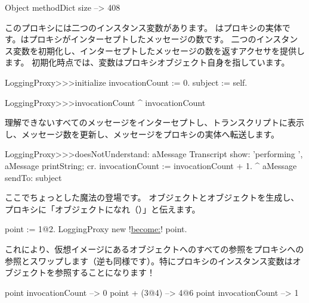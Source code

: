\documentclass[a4paper,10pt,twoside]{book}
\begin{document}
\begin{code}{}
Object methodDict size --> 408
\end{code}

このプロキシには二つのインスタンス変数があります。  はプロキシの実体です。はプロキシがインターセプトしたメッセージの数です。
二つのインスタンス変数を初期化し、インターセプトしたメッセージの数を返すアクセサを提供します。
初期化時点では、変数はプロキシオブジェクト自身を指しています。
\begin{code}{}
LoggingProxy>>>initialize
	invocationCount := 0.
	subject := self.
\end{code}

\begin{code}{}
LoggingProxy>>>invocationCount
	^ invocationCount
\end{code}

理解できないすべてのメッセージをインターセプトし、トランスクリプトに表示し、メッセージ数を更新し、メッセージをプロキシの実体へ転送します。

\begin{code}{}
LoggingProxy>>>doesNotUnderstand: aMessage 
	Transcript show: 'performing ', aMessage printString; cr.
	invocationCount := invocationCount + 1.
	^ aMessage sendTo: subject
\end{code}

ここでちょっとした魔法の登場です。
オブジェクトとオブジェクトを生成し、プロキシに「オブジェクトになれ（）」と伝えます。
\begin{code}{}
point := 1@2.
LoggingProxy new !\underline{become:}! point.
\end{code}

これにより、仮想イメージにあるオブジェクトへのすべての参照をプロキシへの参照とスワップします（逆も同様です）。特にプロキシのインスタンス変数はオブジェクトを参照することになります！

\begin{code}{}
point invocationCount --> 0
point + (3@4)             --> 4@6
point invocationCount --> 1
\end{code}
\end{document}
